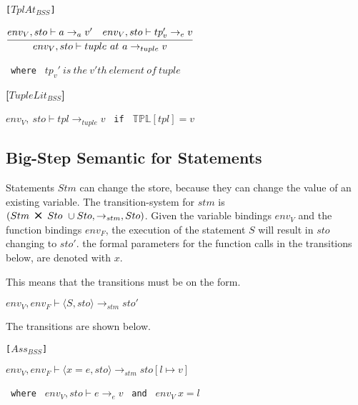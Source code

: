 \texttt{[$TplAt_{BSS}$]}\\
\begin{center}
	\begin{math}
	\cfrac
	{env_V, sto \vdash a \rightarrow_{a} v' \quad env_V, sto \vdash tp_v' \rightarrow_e v}
	{env_V, sto \vdash tuple\ at\ a \rightarrow_{tuple} v}
	\end{math}
	
	\texttt{ where } $tp_v'\ is\ the\ v'th\ element\ of\ tuple$
\end{center}

\textbf{[$TupleLit_{BSS}$]}\\
\begin{center}
	\begin{math}
	env_V,\ sto \vdash tpl \rightarrow_{tuple} v
	\end{math}
	\texttt{ if } $\mathbb{TPL}[tpl] = v$
\end{center}

\subsection{Big-Step Semantic for Statements}
Statements $Stm$ can change the store, because they can change the value of an existing variable.
The transition-system for $stm$ is $(Stm\ \Cross\ Sto\ \cup Sto, \rightarrow_{stm}, Sto)$.
Given the variable bindings $env_V$ and the function bindings $env_F$, the execution of the statement $S$ will 
result in $sto$ changing to $sto'$.
the formal parameters for the function calls in the transitions below, are denoted with $x$.

This means that the transitions must be on the form.

\begin{center}
	\begin{math}
		{env_V, env_F \vdash \langle S, sto \rangle \rightarrow_{stm} sto'}
	\end{math}
\end{center}

The transitions are shown below.

\texttt{[$Ass_{BSS}$]}\\
\begin{center}
	\begin{math}
		{env_V, env_F \vdash \langle x = e, sto \rangle \rightarrow_{stm} sto[l \mapsto v]}
	\end{math}
	
	\texttt{ where } $env_V, sto \vdash e \rightarrow_e v$
	\texttt{ and } $env_V\ x = l$
\end{center}

